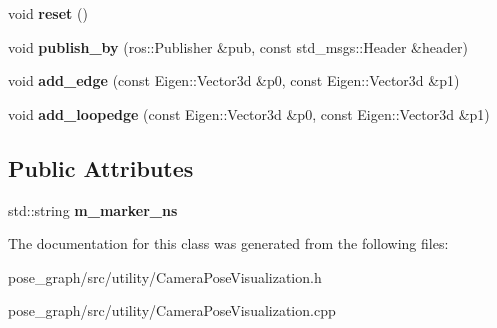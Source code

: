 \begin{DoxyCompactItemize}
\item 
\mbox{\label{classCameraPoseVisualization_a0a6a3843b6c43675ee8d3862b274394a}} 
void {\bfseries reset} ()
\item 
\mbox{\label{classCameraPoseVisualization_af622cbb53e629b09a19dcd0396ce0c1d}} 
void {\bfseries publish\+\_\+by} (ros\+::\+Publisher \&pub, const std\+\_\+msgs\+::\+Header \&header)
\item 
\mbox{\label{classCameraPoseVisualization_a2e3e88742eff639180ba89e2f25ee04f}} 
void {\bfseries add\+\_\+edge} (const Eigen\+::\+Vector3d \&p0, const Eigen\+::\+Vector3d \&p1)
\item 
\mbox{\label{classCameraPoseVisualization_a632e29693827194f8d16afb426992bce}} 
void {\bfseries add\+\_\+loopedge} (const Eigen\+::\+Vector3d \&p0, const Eigen\+::\+Vector3d \&p1)
\end{DoxyCompactItemize}
\subsection*{Public Attributes}
\begin{DoxyCompactItemize}
\item 
\mbox{\label{classCameraPoseVisualization_ab763ec726c4104cfc3f76eb9ba91bc1c}} 
std\+::string {\bfseries m\+\_\+marker\+\_\+ns}
\end{DoxyCompactItemize}


The documentation for this class was generated from the following files\+:\begin{DoxyCompactItemize}
\item 
pose\+\_\+graph/src/utility/Camera\+Pose\+Visualization.\+h\item 
pose\+\_\+graph/src/utility/Camera\+Pose\+Visualization.\+cpp\end{DoxyCompactItemize}
